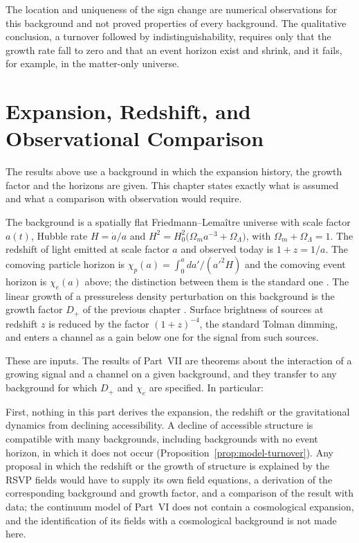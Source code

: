 \documentclass[11pt,oneside]{book}
\theoremstyle{definition}
\theoremstyle{remark}
\begin{document}
The location and uniqueness of the sign change are numerical observations for this background and not proved properties of every background. The qualitative conclusion, a turnover followed by indistinguishability, requires only that the growth rate fall to zero and that an event horizon exist and shrink, and it fails, for example, in the matter-only universe.

\chapter{Expansion, Redshift, and Observational Comparison}\label{ch:expansion}

The results above use a background in which the expansion history, the growth factor and the horizons are given. This chapter states exactly what is assumed and what a comparison with observation would require.

The background is a spatially flat Friedmann--Lema\^itre universe with scale factor $a(t)$, Hubble rate $H=\dot a/a$ and $H^2=H_0^2\bigl(\Omega_ma^{-3}+\Omega_\Lambda\bigr)$, with $\Omega_m+\Omega_\Lambda=1$. The redshift of light emitted at scale factor $a$ and observed today is $1+z=1/a$. The comoving particle horizon is $\chi_p(a)=\int_0^a da'/(a'^2H)$ and the comoving event horizon is $\chi_e(a)$ above; the distinction between them is the standard one \cite{davis2004}. The linear growth of a pressureless density perturbation on this background is the growth factor $D_+$ of the previous chapter \cite{heath1977,peebles1980}. Surface brightness of sources at redshift $z$ is reduced by the factor $(1+z)^{-4}$, the standard Tolman dimming, and enters a channel as a gain below one for the signal from such sources.

These are inputs. The results of Part~VII are theorems about the interaction of a growing signal and a channel on a given background, and they transfer to any background for which $D_+$ and $\chi_e$ are specified. In particular:

First, nothing in this part derives the expansion, the redshift or the gravitational dynamics from declining accessibility. A decline of accessible structure is compatible with many backgrounds, including backgrounds with no event horizon, in which it does not occur (Proposition~\ref{prop:model-turnover}). Any proposal in which the redshift or the growth of structure is explained by the RSVP fields would have to supply its own field equations, a derivation of the corresponding background and growth factor, and a comparison of the result with data; the continuum model of Part~VI does not contain a cosmological expansion, and the identification of its fields with a cosmological background is not made here.
\end{document}
